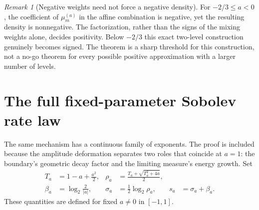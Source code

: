 \documentclass[11pt,a4paper,oneside,openany]{book}
\numberwithin{equation}{chapter}
\theoremstyle{definition}
\theoremstyle{remark}
\newtheorem{remark}[theorem]{Remark}
\begin{document}
\begin{remark}[Negative weights need not force a negative density]
For $-2/3\le a<0$, the coefficient of $\mu_m^{(a)}$ in the affine combination
is negative, yet the resulting density is nonnegative. The factorization, rather
than the signs of the mixing weights alone, decides positivity. Below $-2/3$
this exact two-level construction genuinely becomes signed. The theorem is a
sharp threshold for this construction, not a no-go theorem for every possible
positive approximation with a larger number of levels.
\end{remark}

\section{The full fixed-parameter Sobolev rate law}
The same mechanism has a continuous family of exponents. The proof is included
because the amplitude deformation separates two roles that coincide at $a=1$:
the boundary's geometric decay factor and the limiting measure's energy growth.
Set
\begin{align}
 T_a&=1-a+\frac{a^2}{2},&
 \rho_a&=\frac{T_a+\sqrt{T_a^2+4a}}2,\label{bc:eq:rhoa}\\
 \beta_a&=\log_2\frac2{|a|},&
 \sigma_a&=\frac12\log_2\rho_a,& s_a&=\sigma_a+\beta_a.
 \label{bc:eq:param-exponents}
\end{align}
These quantities are defined for fixed $a\ne0$ in $[-1,1]$.
\end{document}
